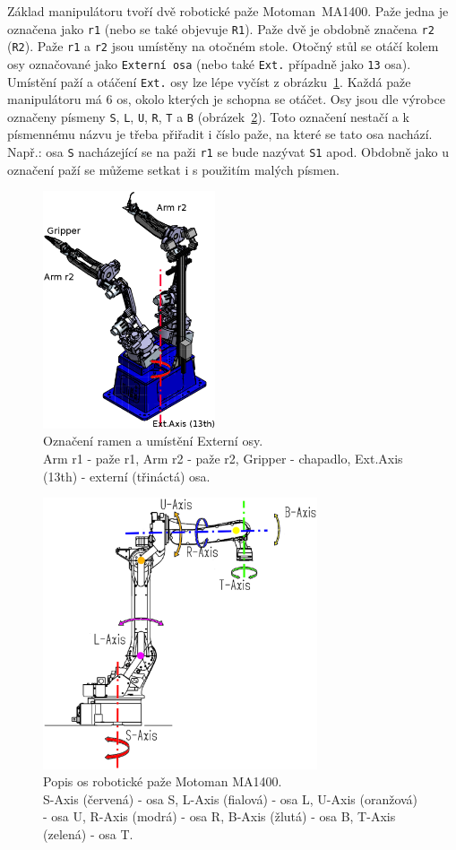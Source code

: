 \documentclass[10pt,a4paper,titlepage,oneside]{report}
\begin{document}
Základ manipulátoru tvoří dvě robotické paže Motoman~MA1400. Paže jedna je označena jako \verb|r1| (nebo se také objevuje \verb|R1|). Paže dvě je obdobně značena \verb|r2| (\verb|R2|). Paže \verb|r1| a \verb|r2| jsou umístěny na otočném stole. Otočný stůl se otáčí kolem osy označované jako \verb|Externí osa| (nebo také \verb|Ext.| případně jako \verb|13| osa). Umístění paží a otáčení \verb|Ext.| osy lze lépe vyčíst z obrázku~\ref{fig:motomanAndTable}. Každá paže manipulátoru má 6 os, okolo kterých je schopna se otáčet. Osy jsou dle výrobce označeny písmeny \verb|S|, \verb|L|, \verb|U|, \verb|R|, \verb|T| a \verb|B| (obrázek~\ref{fig:motomanAxis}). Toto označení nestačí a k písmennému názvu je třeba přiřadit i číslo paže, na které se tato osa nachází. Např.: osa \verb|S| nacházející se na paži \verb|r1| se bude nazývat \verb|S1| apod. Obdobně jako u označení paží se můžeme setkat i s použitím malých písmen.
\begin{figure}[H]
	\centering  	
  	\includegraphics[height=7cm]{pictures/motomanCelek.eps}
  	\caption[]{Označení ramen a umístění Externí osy.\\
	Arm r1 - paže r1,
	Arm r2 - paže r2,
	Gripper - chapadlo,
	Ext.Axis (13th) - externí (třináctá) osa.	  	
  	}
  	\label{fig:motomanAndTable}
\end{figure}

\begin{figure}[H]
	\centering  	
  	\includegraphics[height=8cm]{pictures/motomanMA1400axis.eps}
  	\caption[]{Popis os robotické paže Motoman MA1400.\\ 
  	S-Axis (červená) - osa S, 
  	L-Axis (fialová) - osa L, 
  	U-Axis (oranžová) - osa U, 
  	R-Axis (modrá) - osa R, 
  	B-Axis (žlutá) - osa B,
  	T-Axis (zelená) - osa T.}
  	\label{fig:motomanAxis}
\end{figure}
\end{document}
